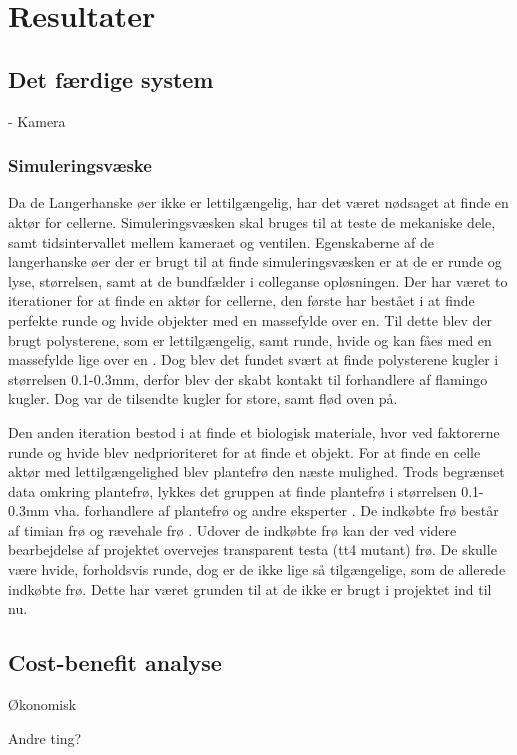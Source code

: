 \chapter{Resultater}

\section{Det færdige system}
- Kamera




\subsection{Simuleringsvæske}
Da de Langerhanske øer ikke er lettilgængelig, har det været nødsaget at finde en aktør for cellerne. Simuleringsvæsken skal bruges til at teste de mekaniske dele, samt tidsintervallet mellem kameraet og ventilen. Egenskaberne af de langerhanske øer der er brugt til at finde simuleringsvæsken er at de er runde og lyse, størrelsen, samt at de bundfælder i colleganse opløsningen. Der har været to iterationer for at finde en aktør for cellerne, den første har bestået i at finde perfekte runde og hvide objekter med en massefylde over en. Til dette blev der brugt polysterene, som er lettilgængelig, samt runde, hvide og kan fåes med en massefylde lige over en . Dog blev det fundet svært at finde polysterene kugler i størrelsen 0.1-0.3mm, derfor blev der skabt kontakt til forhandlere af flamingo kugler. Dog var de tilsendte kugler for store, samt flød oven på. 

Den anden iteration bestod i at finde et biologisk materiale, hvor ved faktorerne runde og hvide blev nedprioriteret for at finde et objekt. For at finde en celle aktør med lettilgængelighed blev plantefrø den næste mulighed. Trods begrænset data omkring plantefrø, lykkes det gruppen at finde plantefrø i størrelsen 0.1-0.3mm vha. forhandlere af plantefrø og andre eksperter . De indkøbte frø består af timian frø og rævehale frø . Udover de indkøbte frø kan der ved videre bearbejdelse af projektet overvejes transparent testa (tt4 mutant) frø. De skulle være hvide, forholdsvis runde, dog er de ikke lige så tilgængelige, som de allerede indkøbte frø. Dette har været grunden til at de ikke er brugt i projektet ind til nu. 
 

\section{Cost-benefit analyse}
Økonomisk






Andre ting?